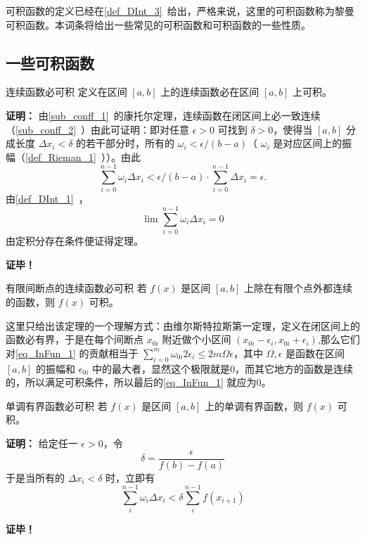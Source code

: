 可积函数的定义已经在\autoref{def_DInt_3}~给出，严格来说，这里的可积函数称为黎曼可积函数。本词条将给出一些常见的可积函数和可积函数的一些性质。
\subsection{一些可积函数}
\begin{theorem}{连续函数必可积}
定义在区间 $[a,b]$ 上的连续函数必在区间 $[a,b]$ 上可积。
\end{theorem}
\textbf{证明：}
由\autoref{sub_conff_1}~的康托尔定理，连续函数在闭区间上必一致连续（\autoref{sub_conff_2}~）由此可证明：即对任意 $\epsilon>0$ 可找到 $\delta>0$，使得当 $[a,b]$ 分成长度 $\Delta x_i<\delta$ 的若干部分时，所有的 $\omega_i<\epsilon/(b-a)$（ $\omega_i$ 是对应区间上的振幅（\autoref{def_Rieman_1}~））。由此
\begin{equation}
\sum_{i=0}^{n-1}\omega_i\Delta x_i<\epsilon/(b-a)\cdot\sum_{i=0}^{n-1}\Delta x_i=\epsilon.
\end{equation}
由\autoref{def_DInt_1}~，
\begin{equation}\label{eq_InFun_1}
\lim\sum_{i=0}^{n-1}\omega_i\Delta x_i=0
\end{equation}
由定积分存在条件便证得定理。

\textbf{证毕！}

\begin{theorem}{有限间断点的连续函数必可积}
若 $f(x)$ 是区间 $[a,b]$ 上除在有限个点外都连续的函数，则 $f(x)$ 可积。
\end{theorem}
这里只给出该定理的一个理解方式：由维尔斯特拉斯第一定理，定义在闭区间上的函数必有界，于是在每个间断点 $x_{0i}$ 附近做个小区间 $(x_{0i}-\epsilon_i,x_{0i}+\epsilon_i)$,那么它们对\autoref{eq_InFun_1} 的贡献相当于 $\sum_{i=0}^{m}\omega_{0i}2\epsilon_i\leq2m\Omega\epsilon $，其中 $\Omega,\epsilon$ 是函数在区间 $[a,b]$ 的振幅和 $\epsilon_{0i}$ 中的最大者，显然这个极限就是0，而其它地方的函数是连续的，所以满足可积条件，所以最后的\autoref{eq_InFun_1} 就应为0。 

\begin{theorem}{单调有界函数必可积}
若 $f(x)$ 是区间 $[a,b]$ 上的单调有界函数，则 $f(x)$ 可积。
\end{theorem}
\textbf{证明：}
给定任一 $\epsilon>0$，令 
\begin{equation}
\delta=\frac{\epsilon}{f(b)-f(a)}
\end{equation}
于是当所有的 $\Delta x_i<\delta$ 时，立即有
\begin{equation}
\sum_{i}^{n-1}\omega_i\Delta x_i<\delta\sum_{i}^{n-1}f(x_{i+1})
\end{equation}



\textbf{证毕！}